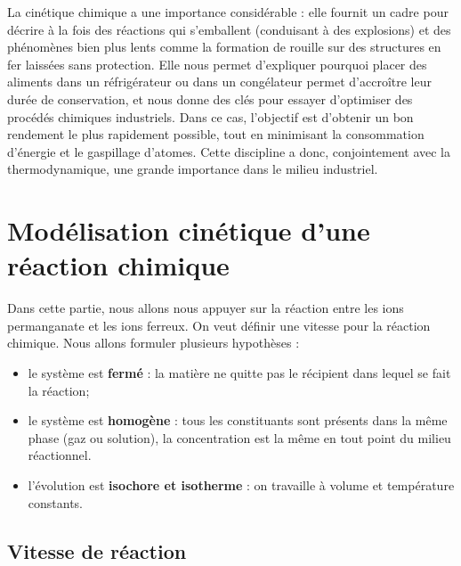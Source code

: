 \documentclass[11pt,a4paper]{report}
\begin{document}
La cinétique chimique a une importance considérable : elle fournit un cadre pour décrire à la fois des réactions qui s'emballent (conduisant à des explosions) et des phénomènes bien plus lents comme la formation de rouille sur des structures en fer laissées sans protection. Elle nous permet d'expliquer pourquoi placer des aliments dans un réfrigérateur ou dans un congélateur permet d'accroître leur durée de conservation, et nous donne des clés pour essayer d'optimiser des procédés chimiques industriels. Dans ce cas, l'objectif est d'obtenir un bon rendement le plus rapidement possible, tout en minimisant la consommation d'énergie et le gaspillage d'atomes. Cette discipline a donc, conjointement avec la thermodynamique, une grande importance dans le milieu industriel.

\newpage
\section{Modélisation cinétique d'une réaction chimique}\label{sec:1}

Dans cette partie, nous allons nous appuyer sur la réaction entre les ions permanganate et les ions ferreux. On veut définir une vitesse pour la réaction chimique. Nous allons formuler plusieurs hypothèses :
\begin{itemize}
	\item le système est \textbf{fermé} : la matière ne quitte pas le récipient dans lequel se fait la réaction;
	\item le système est \textbf{homogène} : tous les constituants sont présents dans la même phase (gaz ou solution), la concentration est la même en tout point du milieu réactionnel.
	\item l'évolution est \textbf{isochore et isotherme} : on travaille à volume et température constants.
\end{itemize}

\subsection{Vitesse de réaction}
\end{document}
